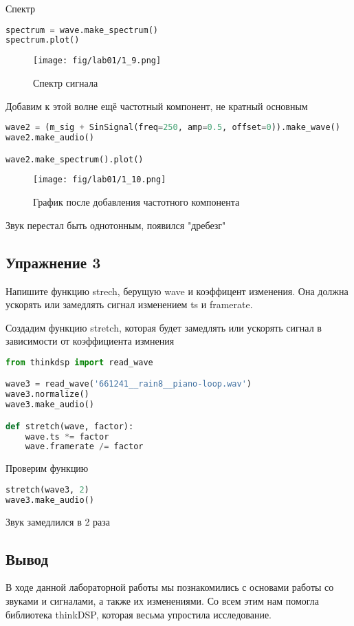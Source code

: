 Спектр
\begin{lstlisting}[language=Python]
spectrum = wave.make_spectrum()
spectrum.plot()
\end{lstlisting}

\begin{figure}[H]
	\begin{center}
		\texttt{[image: fig/lab01/1\_9.png]}
		\caption{Спектр сигнала}
	\end{center}
\end{figure}

Добавим к этой волне ещё частотный компонент, не кратный основным
\begin{lstlisting}[language=Python]
wave2 = (m_sig + SinSignal(freq=250, amp=0.5, offset=0)).make_wave()
wave2.make_audio()

wave2.make_spectrum().plot()
\end{lstlisting}

\begin{figure}[H]
	\begin{center}
		\texttt{[image: fig/lab01/1\_10.png]}
		\caption{График после добавления частотного компонента}
	\end{center}
\end{figure}

Звук перестал быть однотонным, появился "дребезг"


\subsection{Упражнение 3}

Напишите функцию strech, берущую wave и коэффицент изменения. Она должна ускорять или замедлять сигнал изменением ts и framerate.

Создадим функцию stretch, которая будет замедлять или ускорять сигнал в зависимости от коэффициента измнения
\begin{lstlisting}[language=Python]
from thinkdsp import read_wave

wave3 = read_wave('661241__rain8__piano-loop.wav')
wave3.normalize()
wave3.make_audio()

def stretch(wave, factor):
    wave.ts *= factor
    wave.framerate /= factor
\end{lstlisting}

Проверим функцию
\begin{lstlisting}[language=Python]
stretch(wave3, 2)
wave3.make_audio()
\end{lstlisting}

Звук замедлился в 2 раза

\subsection{Вывод}
В ходе данной лабораторной работы мы познакомились с основами работы со звуками и сигналами, а также их изменениями. Со всем этим нам помогла библиотека thinkDSP, которая весьма упростила исследование.